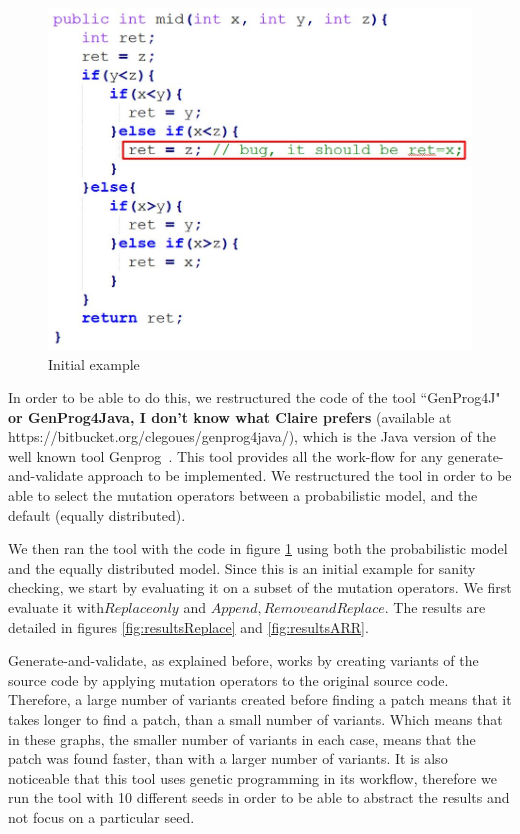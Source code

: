 \documentclass[conference]{IEEEtran}
\newcommand{\todo}[1]
  {{\scriptsize \textbf{\color{red} {#1}}}}
\begin{document}
\begin{figure}[!h]
  \centering
    \includegraphics[scale=0.35]{sanity2}
  \caption{Initial example}
  \label{fig:initialExample}
\end{figure}

In order to be able to do this, we restructured the code of the tool ``GenProg4J" 
\todo{or GenProg4Java, I don't know what Claire prefers} (available at 
https://bitbucket.org/clegoues/genprog4java/), which is the Java version of the 
well known tool Genprog~\cite{legoues12}. This tool provides all the work-flow 
for any generate-and-validate approach to be implemented. We restructured the 
tool in order to be able to select the mutation operators between a 
probabilistic model, and the default (equally distributed).

We then ran the tool with the code in figure \ref{fig:initialExample} using both 
the probabilistic model and the equally distributed model. Since this is an 
initial example for sanity checking, we start by evaluating it on a subset of 
the mutation operators. We first evaluate it with$ Replace only$ and $Append, 
Remove and Replace$. The results are detailed in figures 
\ref{fig:resultsReplace} and \ref{fig:resultsARR}. 

Generate-and-validate, as explained before, works by creating variants of the 
source code by applying mutation operators to the original source code. 
Therefore, a large number of variants created before finding a patch means that 
it takes longer to find a patch, than a small number of variants. Which means 
that in these graphs, the smaller number of variants in each case, means that 
the patch was found faster, than with a larger number of variants. It is also 
noticeable that this tool uses genetic programming in its workflow, therefore we 
run the tool with 10 different seeds in order to be able to abstract the results 
and not focus on a particular seed.
\end{document}

